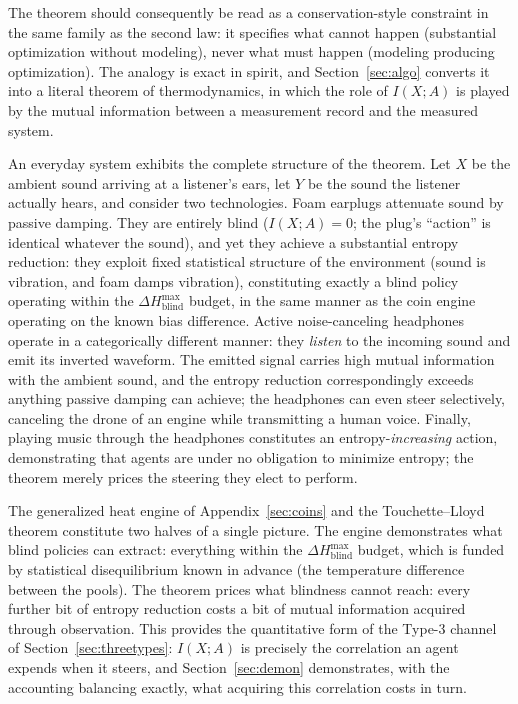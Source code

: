 \documentclass[11pt]{article}
\begin{document}
The theorem should consequently be read as a conservation-style constraint in the same family as the second law: it specifies what cannot happen (substantial optimization without modeling), never what must happen (modeling producing optimization). The analogy is exact in spirit, and Section~\ref{sec:algo} converts it into a literal theorem of thermodynamics, in which the role of $I(X;A)$ is played by the mutual information between a measurement record and the measured system.

\begin{example}
\label{ex:headphones}
An everyday system exhibits the complete structure of the theorem. Let $X$ be the ambient sound arriving at a listener's ears, let $Y$ be the sound the listener actually hears, and consider two technologies. Foam earplugs attenuate sound by passive damping. They are entirely blind ($I(X;A) = 0$; the plug's ``action'' is identical whatever the sound), and yet they achieve a substantial entropy reduction: they exploit fixed statistical structure of the environment (sound is vibration, and foam damps vibration), constituting exactly a blind policy operating within the $\Delta H^{\max}_{\text{blind}}$ budget, in the same manner as the coin engine operating on the known bias difference. Active noise-canceling headphones operate in a categorically different manner: they \emph{listen} to the incoming sound and emit its inverted waveform. The emitted signal carries high mutual information with the ambient sound, and the entropy reduction correspondingly exceeds anything passive damping can achieve; the headphones can even steer selectively, canceling the drone of an engine while transmitting a human voice. Finally, playing music through the headphones constitutes an entropy-\emph{increasing} action, demonstrating that agents are under no obligation to minimize entropy; the theorem merely prices the steering they elect to perform.
\end{example}

\begin{remark}
The generalized heat engine of Appendix~\ref{sec:coins} and the Touchette--Lloyd theorem constitute two halves of a single picture. The engine demonstrates what blind policies can extract: everything within the $\Delta H^{\max}_{\text{blind}}$ budget, which is funded by statistical disequilibrium known in advance (the temperature difference between the pools). The theorem prices what blindness cannot reach: every further bit of entropy reduction costs a bit of mutual information acquired through observation. This provides the quantitative form of the Type-3 channel of Section~\ref{sec:threetypes}: $I(X;A)$ is precisely the correlation an agent expends when it steers, and Section~\ref{sec:demon} demonstrates, with the accounting balancing exactly, what acquiring this correlation costs in turn.
\end{remark}
\end{document}
